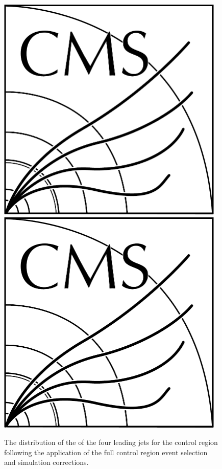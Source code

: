 \begin{figure}[htb]
\\
\includegraphics[width=0.97\textwidth]{CMS-bw-logo.pdf}
\\
\includegraphics[width=0.97\textwidth]{CMS-bw-logo.pdf}
\caption{
The distribution of the \pt of the four leading jets for the \ttbar control region following the application of the full control region event selection and simulation corrections.
}
\label{fig:ttbarCR_jetPt}
\end{figure}

